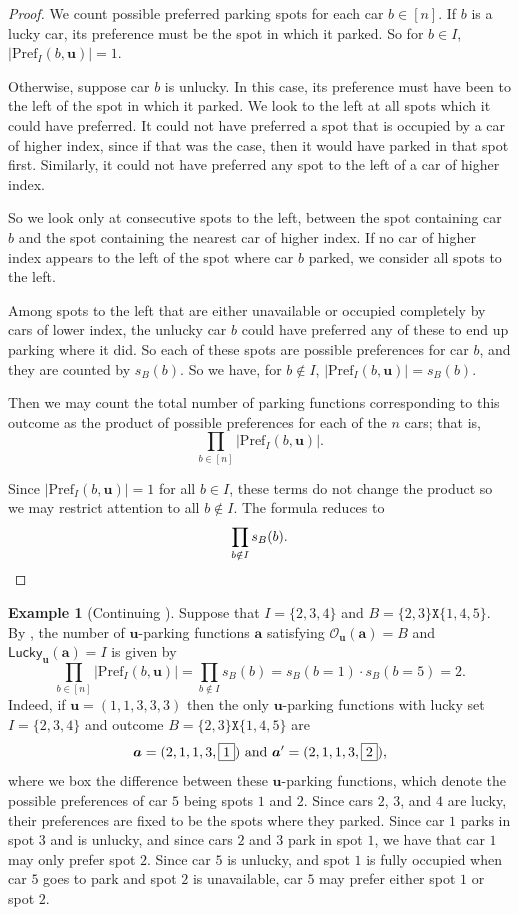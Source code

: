 \documentclass[reqno]{amsart}
\newcommand{\X}{\texttt{X}}
\newcommand{\Pref}{\mathrm{Pref}}
\newcommand{\Lucky}{\mathsf{Lucky}}
\theoremstyle{definition}
\newtheorem{example}[theorem]{Example}
\theoremstyle{remark}
\newcommand{\out}{\mathcal{O}}
\newcommand{\bsy}{\boldsymbol}
\begin{document}
\begin{proof}
We count possible preferred parking spots for each car $b \in [n]$.
If $b$ is a lucky car, its preference must be the spot in which it parked. So for  $b \in I$, $|\Pref_{I}(b,\bsy{u})| = 1$.

Otherwise, suppose car $b$ is unlucky. In this case, its preference must have been to the left of the spot in which it parked. 
We look to the left at all spots which it could have preferred. It could not have preferred a spot that is occupied by a car of higher index, since if that was the case, then it would have parked in that spot first. Similarly, it could not have preferred any spot to the left of a car of higher index. 

So we look only at consecutive spots to the left, between the spot containing car $b$ and the spot containing the nearest car of higher index. If no car of higher index appears to the left of the spot where car $b$ parked, we consider all spots to the left.

Among spots to the left that are either unavailable or occupied completely by cars of lower index, the unlucky car $b$ could have preferred any of these to end up parking where it did. So each of these spots are possible preferences for car $b$, and they are counted by $s_B(b)$. So we have, for $b \notin I$, $|\Pref_{I}(b,\bsy{u})|= s_B(b)$. 

Then we may count the total number of parking functions corresponding to this outcome as the product of possible preferences for each of the $n$ cars; that is, \[\prod_{b\in [n]} |\Pref_{I}(b,\bsy{u})|.\]

Since $|\Pref_{I}(b,\bsy{u})| = 1$ for all $b \in I$, these terms do not change the product so we may restrict attention to all $b \notin I$. The formula reduces to \[\prod_{b\notin I}s_B(b). \qedhere\]
\end{proof}


\begin{example}[Continuing ]\label{ex:pref}
 Suppose that $I=\{2,3,4\}$ and $B=\{2,3\}\X\{1,4,5\}$. 
 By , the number of $\bsy{u}$-parking functions $\bsy{a}$ satisfying $\out_{\bsy{u}}(\bsy{a})=B$ and $\Lucky_{\bsy{u}}(\bsy{a})=I$ is given by
\[
     \prod_{b\in [n]} |\Pref_{I}(b,\bsy{u})|=\prod_{b\notin I}s_B(b)= s_B(b=1)\cdot s_B(b=5) =2.
\]
Indeed, if $\bsy{u}=(1,1,3,3,3)$ then the only $\bsy{u}$-parking functions with lucky set $I=\{2,3,4\}$ and outcome $B=\{2,3\}\X\{1,4,5\}$ are
\[
\bsy{a}=(2,1,1,3,\fbox{1}) \mbox{ and } \bsy{a}'=(2,1,1,3,\fbox{2}), 
\]
where we box the difference between these $\bsy{u}$-parking functions, which denote the possible preferences of car $5$ being spots $1$ and $2$. 
Since cars $2$, $3$, and $4$ are lucky, their preferences are fixed to be the spots where they parked.
Since car $1$ parks in spot $3$ and is unlucky, and since cars $2$ and $3$ park in spot $1$, we have that car $1$ may only prefer spot $2$.
Since car $5$ is unlucky, and spot $1$ is fully occupied when car $5$ goes to park and spot $2$ is unavailable, car $5$ may prefer either spot $1$ or spot $2$.
\end{example}
\end{document}
